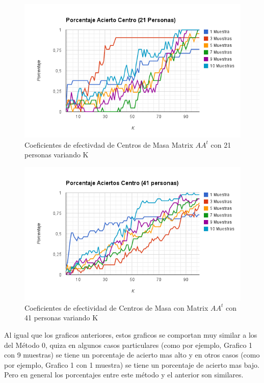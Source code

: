 \begin{figure}[H] \includegraphics[width=1\textwidth]{img/imagen.png} \caption{Coeficientes de
    efectivdad de Centros de Masa Matrix $AA^t$ con 21 personas variando K} \end{figure}

\begin{figure}[H] \includegraphics[width=1\textwidth]{img/imager.png} \caption{Coeficientes de
    efectividad de Centros de Masa con Matrix $AA^t$ con 41 personas variando K} \end{figure}

Al igual que los graficos anteriores, estos graficos se comportan muy similar a los del M\'etodo 0,
quiza en algunos casos particulares (como por ejemplo, Grafico 1 con 9 muestras) se tiene un
porcentaje de acierto mas alto y en otros casos (como por ejemplo, Grafico 1 con 1 muestra) se tiene
un porcentaje de acierto mas bajo. Pero en general los porcentajes entre este m\'etodo y el anterior
son similares.



